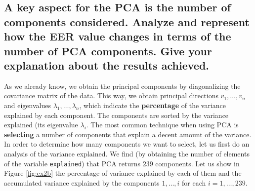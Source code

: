 \documentclass[a4paper]{article}
\def\inline{\lstinline[basicstyle=\ttfamily,keywordstyle={}]}
\begin{document}
\subsection{ A key aspect for the PCA is the number of components considered. Analyze and represent how the EER value changes in terms of the number of PCA components. Give your explanation about the results achieved.}

As we already know, we obtain the principal components by diagonalizing the covariance matrix of the data. This way, we obtain principal directions \(v_1,\dots, v_n\) and eigenvalues \(\lambda_1,\dots,\lambda_n\), which indicate the \textbf{percentage} of the variance explained by each component. The components are sorted by the variance explained (its eigenvalue \(\lambda_i\). The most common technique when using PCA is \textbf{selecting} a number of components that explain a decent amount of the variance. \\

In order to determine how many components we want to select, let us first do an analysis of the variance explained. We find (by obtaining the number of elements of the variable \inline{explained}) that PCA returns \(239\) components. Let us show in Figure \ref{fig:ex2b}  the percentage of variance explained by each of them and the accumulated variance explained by the components \(1,\dots, i\) for each \(i = 1,\dots, 239\). 
\end{document}
